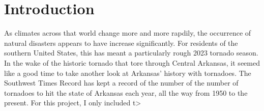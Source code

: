 
\section{Introduction}

As climates across that world change more and more rapdily, the occurrence of natural disasters appears to have increase significantly. For residents of the southern United States,
this has meant a particularly rough 2023 tornado season. In the wake of the historic tornado that tore through Central Arkansas, it seemed like a good time to take another look at Arkansas' history with
tornadoes. The Southwest Times Record has kept a record of the number of the number of tornadoes to hit the state of Arkansas each year, all the way from 1950 to the present. For this project, I only included t>


